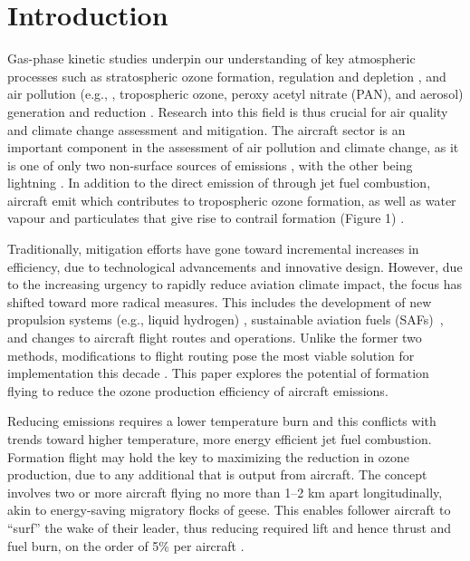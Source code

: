 \section{Introduction}
Gas-phase kinetic studies underpin our understanding of key atmospheric processes such as stratospheric ozone formation, regulation and depletion \cite{Rowland2006, Dameris2010}, and air pollution (e.g., , tropospheric ozone, peroxy acetyl nitrate (PAN), and aerosol) generation and reduction \cite{VonSchneidemesser2015, Stockwell2020}. Research into this field is thus crucial for air quality and climate change assessment and mitigation. The aircraft sector is an important component in the assessment of air pollution and climate change, as it is one of only two non-surface sources of  emissions \cite{Wasiuk2016, Tait2022, Schumann1997}, with the other being lightning \cite{Tie2002, Schumann2007, Stockwell1999}. In addition to the direct emission of  through jet fuel combustion, aircraft emit  which contributes to tropospheric ozone formation, as well as water vapour and particulates that give rise to contrail formation (Figure 1) \cite{Lee2021}. 

Traditionally, mitigation efforts have gone toward incremental increases in efficiency, due to technological advancements and innovative design. However, due to the increasing urgency to rapidly reduce aviation climate impact, the focus has shifted toward more radical measures. This includes the development of new propulsion systems (e.g., liquid hydrogen) \cite{Yusaf2022, Khan2022}, sustainable aviation fuels (SAFs)~\cite{Doliente2020}, and changes to aircraft flight routes and operations. Unlike the former two methods, modifications to flight routing pose the most viable solution for implementation this decade \cite{Niklass2019a}. This paper explores the potential of formation flying to reduce the ozone production efficiency of aircraft  emissions. 

Reducing  emissions requires a lower temperature burn and this conflicts with trends toward higher temperature, more energy efficient jet fuel combustion. Formation flight may hold the key to maximizing the reduction in ozone production, due to any additional  that is output from aircraft. The concept involves two or more aircraft flying no more than 1--2 km apart longitudinally, akin to energy-saving migratory flocks of geese. This enables follower aircraft to “surf” the wake of their leader, thus reducing required lift and hence thrust and fuel burn, on the order of 5\% per aircraft \cite{Xu2014, Bower2009}.

